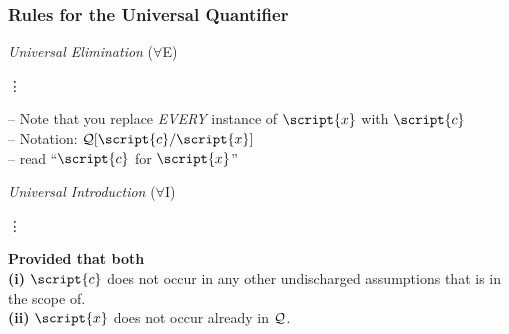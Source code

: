 \begin{frame}
\frametitle{Rules for the Universal Quantifier}

\begin{multicols}{2}

\textit{Universal Elimination} ($\forall$E) \vspace{0em}

\begin{fitchproof}
	 {\hspace{2em} \vdots}
	 

\end{fitchproof}
-- Note that you replace \emph{EVERY} instance of $\script{x}$ with $\script{c}$ \\[1em] -- Notation: $\metav{Q}\substitute{\script{x}}{\script{c}}$ \\[1em] -- read ``$\script{c}$ for $\script{x}$''
\columnbreak

\textit{Universal Introduction} ($\forall$I) \vspace{0em}

\begin{fitchproof}
	 {\hspace{2em} \vdots}
	 
\end{fitchproof}

\textbf{Provided that both} \\
\textbf{(i)} $\script{c}$ does not occur in any other undischarged assumptions that  is in the scope of. \\
\textbf{(ii)} $\script{x}$ does not occur already in $\mathcal{Q}$.
\vspace{2em}
\end{multicols} 

\end{frame}

